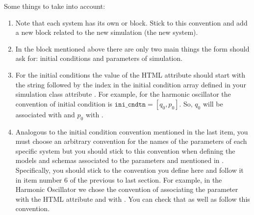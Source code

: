 \documentclass[a4paper,landscape,10pt,english]{sphinxmanual}
\begin{document}
Some things to take into account:
\begin{enumerate}
%
\item {} 
Note that each system has its own  or  block. Stick to this
convention and add a new block related to the new simulation (the new system).

\item {} 
In the  block mentioned above there are only two main things the form
should ask for: initial conditions and parameters of simulation.

\item {} 
For the initial conditions the value of the HTML attribute  should start
with the string  followed by the index in the initial condition
array defined in your simulation class attribute .
For example, for the harmonic oscillator the convention of initial condition
is \(\texttt{ini_cndtn} = [q_0, p_0]\). So, \(q_0\) will be associated
with  and \(p_0\) with .

\item {} 
Analogous to the initial condition convention mentioned in the last
item, you must choose an arbitrary convention for the names of the parameters
of each specific system but you should stick to this convention when defining
the models and schemas associated to the parameters and mentioned in
{\hyperref[\detokenize{code_docs/new_simulation:new-simulation-schemas}]{}}.
Specifically, you should stick to the convention you define here and follow
it in item number 6 of the previous to last section. For example, in the
Harmonic Oscillator we chose the convention of associating the parameter
 with the HTML attribute  and  with
. You can check that
 as well as
{\hyperref[\detokenize{code_docs/simulation_api.controller:simulation_api.controller.schemas.params_mapping_HO}]{}} follow this
convention.

\end{enumerate}
\end{document}
